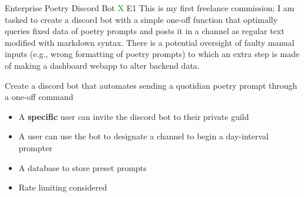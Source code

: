 \documentclass[7px]{article}
\begin{document}
\frontmatter
{Enterprise}
{Poetry Discord Bot}
{\textcolor{green}{X}}
{E1}
{This is my first freelance commission; I am tasked to create a discord bot with a simple one-off function that optimally queries fixed data of poetry prompts and posts it in a channel as regular text modified with markdown syntax. There is a potential oversight of faulty manual inputs (e.g., wrong formatting of poetry prompts) to which an extra step is made of making a dashboard webapp to alter backend data.}

\strategy
{
  Create a discord bot that automates sending a quotidian poetry prompt through a one-off command
}
{
  \begin{enumerate}
    \small
    \begin{itemize}[label=$\multimapdotinv$, leftmargin=1.7mm]
      \item A \textbf{specific} user can invite the discord bot to their private guild
      \item A user can use the bot to designate a channel to begin a day-interval prompter
      \item A database to store preset prompts
      \item Rate limiting considered
    \end{itemize}
    \normalsize
\end{enumerate}
}
\end{document}

